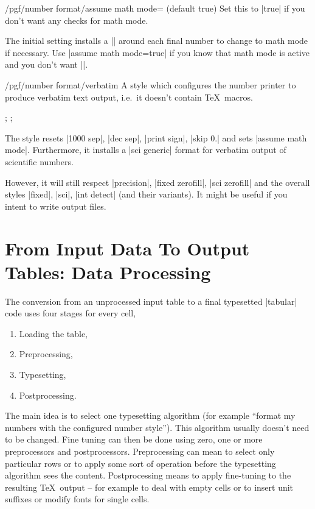 \begin{key}{/pgf/number format/assume math mode= (default true)}
	Set this to |true| if you don't want any checks for math mode.
	
	The initial setting installs a |\pgfutilensuremath| around each final number to change to math mode if necessary. Use |assume math mode=true| if you know that math mode is active and you don't want |\pgfutilensuremath|.
\end{key}

\begin{stylekey}{/pgf/number format/verbatim}
	A style which configures the number printer to produce verbatim text output, i.e.\ it doesn't contain \TeX\ macros.
\begin{codeexample}[]
;
;
\pgfmathprintnumber{\pgfmathresult}
\end{codeexample}
	The style resets |1000 sep|, |dec sep|, |print sign|, |skip 0.| and sets |assume math mode|. Furthermore, it installs a |sci generic| format for verbatim output of scientific numbers.

	However, it will still respect |precision|, |fixed zerofill|, |sci zerofill| and the overall styles |fixed|, |sci|, |int detect| (and their variants). It might be useful if you intent to write output files.
\end{stylekey}




\section{From Input Data To Output Tables: Data Processing}
\label{sec:data:processing}
The conversion from an unprocessed input table to a final typesetted |tabular| code uses four stages for every cell,
\begin{enumerate}
	\item Loading the table,
	\item Preprocessing,
	\item Typesetting,
	\item Postprocessing.
\end{enumerate}
The main idea is to select one typesetting algorithm (for example ``format my numbers with the configured number style''). This algorithm usually doesn't need to be changed. Fine tuning can then be done using zero, one or more preprocessors and postprocessors. Preprocessing can mean to select only particular rows or to apply some sort of operation before the typesetting algorithm sees the content. Postprocessing means to apply fine-tuning to the resulting \TeX\ output -- for example to deal with empty cells or to insert unit suffixes or modify fonts for single cells.

